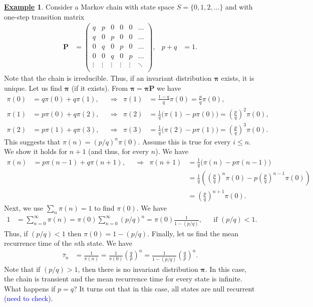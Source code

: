 \documentclass[12pt]{book}
\numberwithin{equation}{chapter}
\theoremstyle{plain}
\numberwithin{theorem}{section}
\theoremstyle{definition}
\newtheorem{example}[theorem]{\underline{Example}}
\numberwithin{exercise}{chapter}
\newcommand{\<}{\langle}
\renewcommand{\>}{\rangle}
\renewcommand{\(}{\left(}
\renewcommand{\)}{\right)}
\renewcommand{\[}{\left[}
\renewcommand{\]}{\right]}
\newcommand\taub{\bar{\tau}}
\newcommand\Pv{\pmb{P}}
\newcommand\piv{\pmb{\pi}}
\newcommand{\blu}[1]{\textcolor{blue}{#1}}
\begin{document}
\begin{example}
Consider a Markov chain with state space $S = \{ 0, 1, 2, \ldots \}$ and with one-step transition matrix
\begin{align}
\Pv
	&=	\( \begin{array}{cccccc}
			q & p & 0 & 0 & 0 & \ldots \\
			q & 0 & p & 0 & 0 & \ldots \\
			0 & q & 0 & p & 0 & \ldots \\
			0 & 0 & q & 0 & p & \ldots \\
			\vdots & \vdots & \vdots & \vdots & \vdots & \ddots \\
			\end{array} \) , &
p + q
	&=	1 .
\end{align}
Note that the chain is irreducible.  Thus, if an invariant distribution $\piv$ exists, it is unique.
Let us find $\piv$ (if it exists).  From $\piv = \piv \Pv$ we have
\begin{align}
\pi(0)
	&=	q \pi(0) + q \pi(1) , &
	&\Rightarrow&
\pi(1)
	&=	\frac{1-q}{q} \pi(0) = \frac{p}{q} \pi(0) , \\
\pi(1)
	&=	p \pi(0) + q \pi(2) , &
	&\Rightarrow&
\pi(2)
	&=	\frac{1}{q} \Big( \pi(1) - p \pi(0) \Big)
	=		\( \frac{p}{q} \)^2 \pi(0) , \\
\pi(2)
	&=	p \pi(1) + q \pi(3) , &
	&\Rightarrow&
\pi(3)
	&=	\frac{1}{q} \Big( \pi(2) - p \pi(1) \Big)
	=		\( \frac{p}{q} \)^3 \pi(0) . 
\end{align}
This suggests that $\pi(n) = (p/q)^n \pi(0)$.  Assume this is true for every $i \leq n$.  We show it holds for $n+1$ (and thus, for every $n$).  We have
\begin{align}
\pi(n)
	&=	p \pi(n-1) + q \pi(n+1) , &
	&\Rightarrow&
\pi(n+1)
	&=	\frac{1}{q} \Big( \pi(n) - p \pi(n-1) \Big) \\ & & & &
	&=	\frac{1}{q} \( \( \frac{p}{q} \)^n \pi(0) - p \( \frac{p}{q} \)^{n-1} \pi(0) \) \\ & & & &
	&=	\( \frac{p}{q} \)^{n+1} \pi(0) .
\end{align}
Next, we use $\sum_n \pi(n) = 1$ to find $\pi(0)$.  We have
\begin{align}
1
	&=	\sum_{n=0}^\infty \pi(n)
	=		\pi(0) \sum_{n=0}^\infty (p/q)^n
	=		\pi(0) \frac{1}{1-(p/q)} , &
	&		\text{if $(p/q) < 1$} .
\end{align}
Thus, if $(p/q) < 1$ then $\pi(0) = 1-(p/q)$.  Finally, let us find the mean recurrence time of the $n$th state.  We have
\begin{align}
\taub_n
	&=	\frac{1 }{ \pi(n) } = \frac{1}{\pi(0)} \( \frac{q}{p} \)^n
	=		\frac{1}{1-(p/q)} \( \frac{q}{p} \)^n .
\end{align}
Note that if $(p/q) > 1$, then there is no invariant distribution $\piv$.  In this case, the chain is transient and the mean recurrence time for every state is infinite.
What happens if $p=q$?  It turns out that in this case, all states are null recurrent \blu{(need to check)}.
\end{example}
\end{document}
